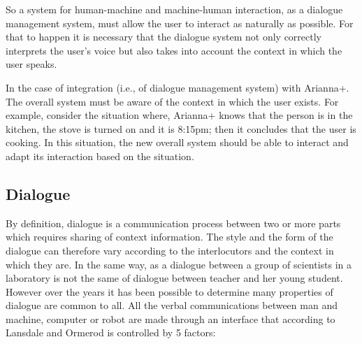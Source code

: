\documentclass{thesisreport}
\begin{document}
 So a system for human-machine and machine-human interaction, as a dialogue management system, must allow the user to interact as naturally as possible. For that to happen it is necessary that the dialogue system not only correctly interprets the user's voice but also takes into account the context in which the user speaks.
 
 In the case of integration (i.e., of dialogue management system) with Arianna+. The overall system must be aware of the context in which the user exists. For example, consider the situation where, Arianna+ knows that the person is in the kitchen, the stove is turned on and it is 8:15pm; then it concludes that the user is cooking. In this situation, the new overall system should be able to interact and adapt its interaction based on the situation.

 \subsection{Dialogue}
 By definition, dialogue is a communication process between two or more parts which requires sharing of context information. The style and the form of the dialogue can therefore vary according to the interlocutors and the context in which they are. In the same way, as a dialogue between a group of scientists in a laboratory is not the same of dialogue between teacher and her young student.
 However over the years it has been possible to determine many properties of dialogue are common to all.
 All the verbal communications between man and machine, computer or robot are made through an interface that according to Lansdale and Ormerod \cite{mccourt1996understanding} is controlled by 5 factors:
\end{document}
